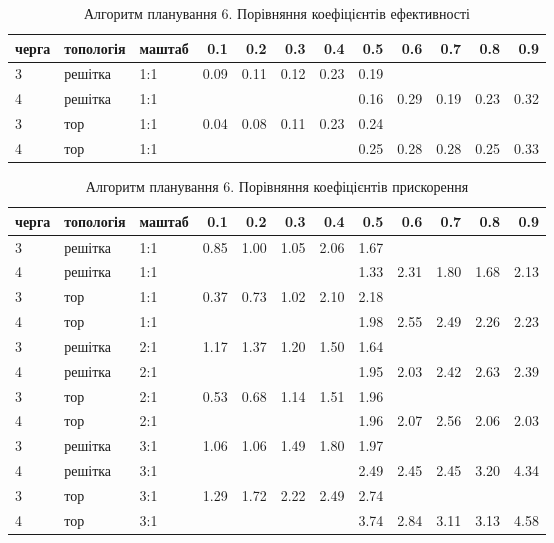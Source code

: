 \begin{table}[H]
\caption{Алгоритм планування 6. Порівняння коефіцієнтів ефективності}
\label{tab:big_table}
\centering
\begin{tabular}{lllrrrrrrrrr}
\toprule
черга & топологія & маштаб &   0.1 &   0.2 &   0.3 &   0.4 &   0.5 &   0.6 &   0.7 &   0.8 &   0.9 \\
\midrule
3 & решітка & 1:1 & 0.09 & 0.11 & 0.12 & 0.23 & 0.19 &  &  &  &  \\
4 & решітка & 1:1 &  &  &  &  & 0.16 & 0.29 & 0.19 & 0.23 & 0.32 \\
3 & тор & 1:1 & 0.04 & 0.08 & 0.11 & 0.23 & 0.24 &  &  &  &  \\
4 & тор & 1:1 &  &  &  &  & 0.25 & 0.28 & 0.28 & 0.25 & 0.33 \\
\bottomrule
\end{tabular}
\end{table}

\begin{table}[H]
\caption{Алгоритм планування 6. Порівняння коефіцієнтів прискорення}
\label{tab:big_table}
\centering
\begin{tabular}{lllrrrrrrrrr}
\toprule
черга & топологія & маштаб &   0.1 &   0.2 &   0.3 &   0.4 &   0.5 &   0.6 &   0.7 &   0.8 &   0.9 \\
\midrule
3 & решітка & 1:1 & 0.85 & 1.00 & 1.05 & 2.06 & 1.67 &  &  &  &  \\
4 & решітка & 1:1 &  &  &  &  & 1.33 & 2.31 & 1.80 & 1.68 & 2.13 \\
3 & тор & 1:1 & 0.37 & 0.73 & 1.02 & 2.10 & 2.18 &  &  &  &  \\
4 & тор & 1:1 &  &  &  &  & 1.98 & 2.55 & 2.49 & 2.26 & 2.23 \\

3 & решітка & 2:1 & 1.17 & 1.37 & 1.20 & 1.50 & 1.64 &  &  &  &  \\
4 & решітка & 2:1 &  &  &  &  & 1.95 & 2.03 & 2.42 & 2.63 & 2.39 \\
3 & тор & 2:1 & 0.53 & 0.68 & 1.14 & 1.51 & 1.96 &  &  &  &  \\
4 & тор & 2:1 &  &  &  &  & 1.96 & 2.07 & 2.56 & 2.06 & 2.03 \\

3 & решітка & 3:1 & 1.06 & 1.06 & 1.49 & 1.80 & 1.97 &  &  &  &  \\
4 & решітка & 3:1 &  &  &  &  & 2.49 & 2.45 & 2.45 & 3.20 & 4.34 \\
3 & тор & 3:1 & 1.29 & 1.72 & 2.22 & 2.49 & 2.74 &  &  &  &  \\
4 & тор & 3:1 &  &  &  &  & 3.74 & 2.84 & 3.11 & 3.13 & 4.58 \\
\bottomrule
\end{tabular}
\end{table}

